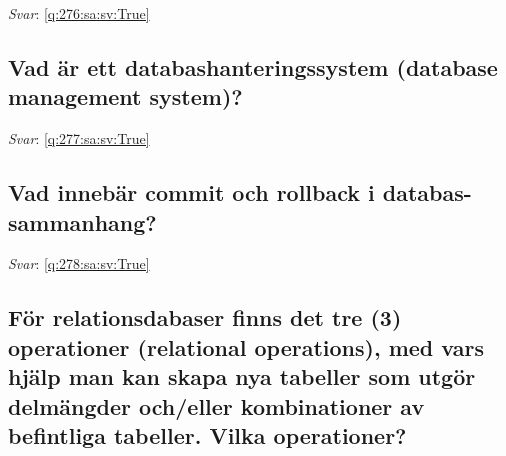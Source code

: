\documentclass[a4paper,11pt,oneside]{article}
\begin{document}
\begin{sloppypar}
\label{q:276:sa:sv:False}

\vspace{2cm}

\noindent\makebox[\textwidth]{\hrulefill}

\vspace{1cm}

\textit{Svar}: \autoref{q:276:sa:sv:True}



\subsection{Vad \"ar ett databashanteringssystem (database management system)?}

\label{q:277:sa:sv:False}

\vspace{2cm}

\noindent\makebox[\textwidth]{\hrulefill}

\vspace{1cm}

\textit{Svar}: \autoref{q:277:sa:sv:True}



\subsection{Vad inneb\"ar commit och rollback i databas-sammanhang?}

\label{q:278:sa:sv:False}

\vspace{2cm}

\noindent\makebox[\textwidth]{\hrulefill}

\vspace{1cm}

\textit{Svar}: \autoref{q:278:sa:sv:True}



\subsection{F\"or relationsdabaser finns det tre (3) operationer (relational operations), med vars hj\"alp man kan skapa nya tabeller som utg\"or delm\"angder och/eller kombinationer av befintliga tabeller. Vilka operationer?}

\label{q:279:sa:sv:False}

\vspace{2cm}

\noindent\makebox[\textwidth]{\hrulefill}


\end{sloppypar}
\end{document}
